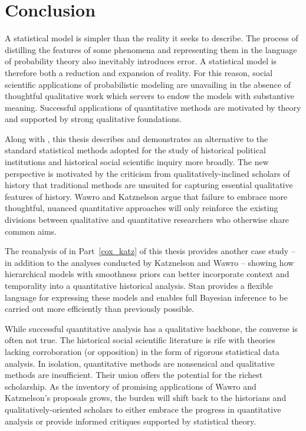 \chapter{Conclusion}
\label{discussion}

A statistical model is simpler than the reality it seeks to describe. The process of 
distilling the features of some phenomena and representing them in the language of 
probability theory also inevitably introduces error. A statistical model is therefore both 
a reduction and expansion of reality. For this reason, social scientific applications of 
probabilistic modeling are unavailing in the absence of thoughtful qualitative work which
servers to endow the models with substantive meaning. Successful applications of quantitative 
methods are motivated by theory and supported by strong qualitative foundations. 

Along with , this thesis describes and demonstrates 
an alternative to the standard statistical methods adopted for the study of historical 
political institutions and historical social scientific inquiry more broadly. The new perspective is 
motivated by the criticism from qualitatively-inclined scholars of history that traditional methods 
are unsuited for capturing essential qualitative features of history. 
Wawro and Katznelson argue that failure to embrace more thoughtful, nuanced quantitative 
approaches will only reinforce the existing divisions between qualitative and quantitative 
researchers who otherwise share common aims. 

The reanalysis of  in Part~\ref{cox_katz} of this thesis 
provides another case study -- in addition to the analyses conducted by Katznelson and 
Wawro -- showing how hierarchical models with smoothness priors can better incorporate 
context and temporality into a quantitative historical analysis. Stan provides a flexible language 
for expressing these models and enables full Bayesian inference to be carried out 
more efficiently than previously possible.  

While successful quantitative analysis has a qualitative backbone, the converse
is often not true. The historical social scientific literature is rife with 
theories lacking corroboration (or opposition) in the form of rigorous 
statistical data analysis. In isolation, quantitative methods are nonsensical and
qualitative methods are insufficient. Their union offers the potential for the richest 
scholarship.  As the inventory of promising applications of Wawro and 
Katznelson's proposals grows, the burden will shift back to the historians and 
qualitatively-oriented scholars to either embrace the progress in quantitative analysis 
or provide informed critiques supported by statistical theory. 

